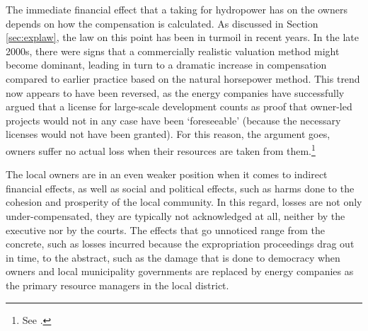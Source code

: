 
The immediate financial effect that a taking for hydropower has on the owners depends on how the compensation is calculated. As discussed in Section \ref{sec:explaw}, the law on this point has been in turmoil in recent years. In the late 2000s, there were signs that a commercially realistic valuation method might become dominant, leading in turn to a dramatic increase in compensation compared to earlier practice based on the natural horsepower method. This trend now appears to have been reversed, as the energy companies have successfully argued that a license for large-scale development counts as proof that owner-led projects would not in any case have been `foreseeable' (because the necessary licenses would not have been granted). For this reason, the argument goes, owners suffer no actual loss when their resources are taken from them.\footnote{See \cite{otra13}.}

The local owners are in an even weaker position when it comes to indirect financial effects, as well as social and political effects, such as harms done to the cohesion and prosperity of the local community. In this regard, losses are not only under-compensated, they are typically not acknowledged at all, neither by the executive nor by the courts. The effects that go unnoticed range from the concrete, such as losses incurred because the expropriation proceedings drag out in time, to the abstract, such as the damage that is done to democracy when owners and local municipality governments are replaced by energy companies as the primary resource managers in the local district.


